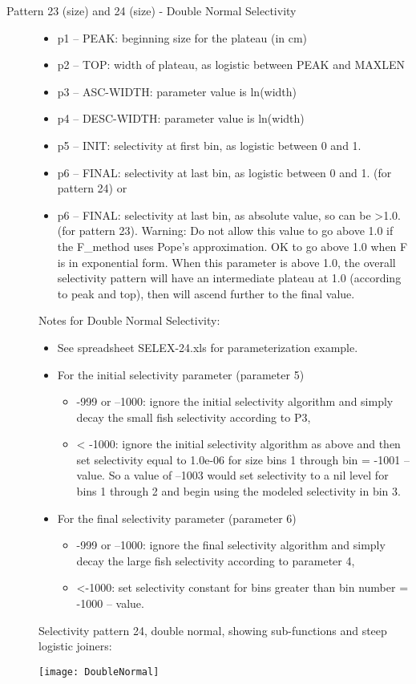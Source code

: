 \begin{description}
	\item[Pattern 23 (size) and 24 (size) - Double Normal Selectivity]\hfil
	\begin{itemize}
		\item p1 – PEAK:  beginning size for the plateau (in cm)
		\item p2 – TOP:  width of plateau, as logistic between PEAK and MAXLEN
		\item p3 – ASC-WIDTH:  parameter value is ln(width)
		\item p4 – DESC-WIDTH:  parameter value is ln(width)
		\item p5 – INIT:  selectivity at first bin, as logistic between 0 and 1.
		\item p6 – FINAL: selectivity at last bin, as logistic between 0 and 1.  (for pattern 24) or
		\item p6 – FINAL: selectivity at last bin, as absolute value, so can be >1.0.  (for pattern 23).  Warning:  Do not allow this value to go above 1.0 if the F\_method uses Pope’s approximation.  OK to go above 1.0 when F is in exponential form.  When this parameter is above 1.0, the overall selectivity pattern will have an intermediate plateau at 1.0 (according to peak and top), then will ascend further to the final value.
	\end{itemize}
	Notes for Double Normal Selectivity:
	\begin{itemize}
		\item See spreadsheet SELEX-24.xls for parameterization example.
		\item For the initial selectivity parameter (parameter 5)
		\begin{itemize}
			\item -999 or –1000:   ignore the initial selectivity algorithm and simply decay the small fish selectivity according to P3,
			\item < -1000:  ignore the initial selectivity algorithm as above and then set selectivity equal to 1.0e-06 for size bins 1 through bin =  -1001 –value.  So a value of –1003 would set selectivity to a nil level for bins 1 through 2 and begin using the modeled selectivity in bin 3.
		\end{itemize}
		\item For the final selectivity parameter (parameter 6)
		\begin{itemize}
			\item -999 or –1000:   ignore the final selectivity algorithm and simply decay the large fish selectivity according to parameter 4,
			\item <-1000:  set selectivity constant for bins greater than bin number =  -1000 – value.
		\end{itemize}
	\end{itemize}
	Selectivity pattern 24, double normal, showing sub-functions and steep logistic joiners:
	\begin{center}
		\texttt{[image: DoubleNormal]}
	\end{center}
\end{description}

